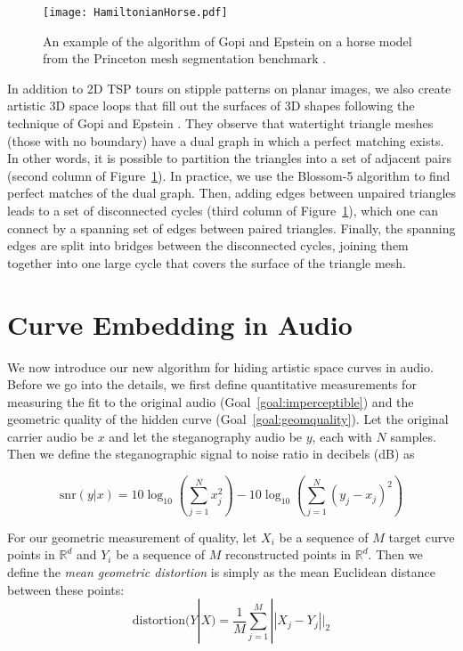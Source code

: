 \documentclass[runningheads]{llncs}
\begin{document}
\begin{figure}
  \centering
  \texttt{[image: HamiltonianHorse.pdf]}
  \caption{An example of the algorithm of Gopi and Epstein \cite{gopi2004single} on a horse model from the Princeton mesh segmentation benchmark \cite{Chen:2009:ABF}.}
  \label{fig:HamiltonianHorse}
\end{figure}

In addition to 2D TSP tours on stipple patterns on planar images, we also create artistic 3D space loops that fill out the surfaces of 3D shapes following the technique of Gopi and Epstein \cite{gopi2004single}.  They observe that watertight triangle meshes (those with no boundary) have a dual graph in which a perfect matching exists.  In other words, it is possible to partition the triangles into a set of adjacent pairs (second column of Figure~\ref{fig:HamiltonianHorse}).  In practice, we use the Blossom-5 algorithm \cite{kolmogorov2009blossom} to find perfect matches of the dual graph.  Then, adding edges between unpaired triangles leads to a set of disconnected cycles (third column of Figure~\ref{fig:HamiltonianHorse}), which one can connect by a spanning set of edges between paired triangles.  Finally, the spanning edges are split into bridges between the disconnected cycles, joining them together into one large cycle that covers the surface of the triangle mesh.


\section{Curve Embedding in Audio}
\label{sec:methods}

We now introduce our new algorithm for hiding artistic space curves in audio.  Before we go into the details, we first define quantitative measurements for measuring the fit to the original audio (Goal~\ref{goal:imperceptible}) and the geometric quality of the hidden curve (Goal~\ref{goal:geomquality}).  Let the original carrier audio be $x$ and let the steganography audio be $y$, each with $N$ samples.  Then we define the steganographic signal to noise ratio in decibels (dB) as 

\begin{equation}
  \label{eq:stegsnr}
   \text{snr}(y|x) = 10  \log_{10} \left(\sum_{j=1}^N x_j^2 \right) -  10 \log_{10}\left(\sum_{j=1}^N (y_j-x_j)^2  \right)
\end{equation}

For our geometric measurement of quality, let $X_i$ be a sequence of $M$ target curve points in $\mathbb{R}^d$ and $Y_i$ be a sequence of $M$ reconstructed points in $\mathbb{R}^d$.  Then we define the {\em mean geometric distortion} is simply as the mean Euclidean distance between these points:
\begin{equation}
  \label{eq:distortion}
  \text{distortion}(Y|X) = \frac{1}{M} \sum_{j=1}^M ||X_j - Y_j||_2
\end{equation}
\end{document}

